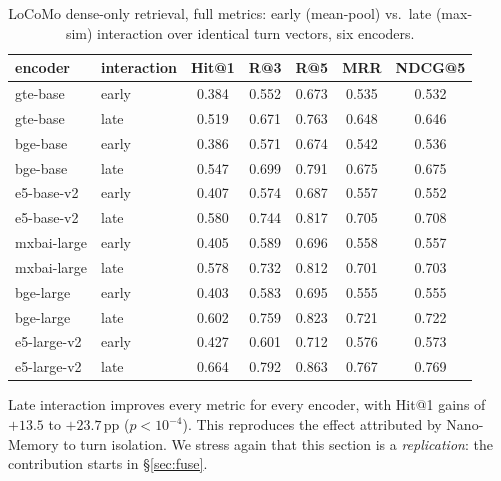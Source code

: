 \documentclass[10pt,twocolumn]{article}
\begin{document}
\begin{table}[t]
\centering\small
\caption{LoCoMo dense-only retrieval, full metrics: early (mean-pool) vs.\
late (max-sim) interaction over identical turn vectors, six encoders.}
\label{tab:densefull}
\begin{tabular}{llccccc}
\toprule
encoder & interaction & Hit@1 & R@3 & R@5 & MRR & NDCG@5 \\
\midrule
gte-base    & early & 0.384 & 0.552 & 0.673 & 0.535 & 0.532 \\
gte-base    & late  & 0.519 & 0.671 & 0.763 & 0.648 & 0.646 \\
bge-base    & early & 0.386 & 0.571 & 0.674 & 0.542 & 0.536 \\
bge-base    & late  & 0.547 & 0.699 & 0.791 & 0.675 & 0.675 \\
e5-base-v2  & early & 0.407 & 0.574 & 0.687 & 0.557 & 0.552 \\
e5-base-v2  & late  & 0.580 & 0.744 & 0.817 & 0.705 & 0.708 \\
mxbai-large & early & 0.405 & 0.589 & 0.696 & 0.558 & 0.557 \\
mxbai-large & late  & 0.578 & 0.732 & 0.812 & 0.701 & 0.703 \\
bge-large   & early & 0.403 & 0.583 & 0.695 & 0.555 & 0.555 \\
bge-large   & late  & 0.602 & 0.759 & 0.823 & 0.721 & 0.722 \\
e5-large-v2 & early & 0.427 & 0.601 & 0.712 & 0.576 & 0.573 \\
e5-large-v2 & late  & 0.664 & 0.792 & 0.863 & 0.767 & 0.769 \\
\bottomrule
\end{tabular}
\end{table}

Late interaction improves every metric for every encoder, with Hit@1 gains of
$+13.5$ to $+23.7$\,pp ($p<10^{-4}$). This reproduces the effect attributed by
Nano-Memory to turn isolation. We stress again that this section is a
\emph{replication}: the contribution starts in \S\ref{sec:fuse}.
\end{document}
